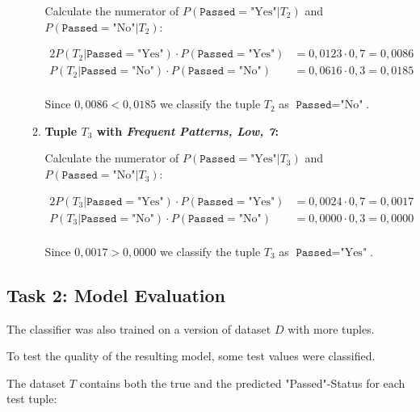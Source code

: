 \documentclass[
english,
smallborders
]{i6prcsht}
\newcommand{\BayesNumerator}[3]{P(#1 | \texttt{#2}=\text{"#3"}) \cdot P(\texttt{#2}=\text{"#3"})}
\newcommand{\PosterioriProbability}[3]{P(\texttt{#2}=\text{"#3"} | #1)}
\newcommand{\ResultClass}[2]{\texttt{#1}=\text{"#2"}}
\begin{document}
\begin{solution}
\begin{enumerate}
\begin{enumerate}
			            Calculate the numerator of $\PosterioriProbability{T_2}{Passed}{Yes}$ and $\PosterioriProbability{T_2}{Passed}{No}$:

			            \begin{alignat*}{2}
				            \BayesNumerator{T_2}{Passed}{Yes} & = 0,0123 \cdot 0,7 = 0,0086 \\
				            \BayesNumerator{T_2}{Passed}{No}  & = 0,0616 \cdot 0,3 = 0,0185 \\
			            \end{alignat*}

			            Since $0,0086 < 0,0185$ we classify the tuple $T_2$ as $\ResultClass{Passed}{No}$.

			      \item \textbf{Tuple $T_3$ with \textit{Frequent Patterns, Low, 7}:}

			            Calculate the numerator of $\PosterioriProbability{T_3}{Passed}{Yes}$ and $\PosterioriProbability{T_3}{Passed}{No}$:

			            \begin{alignat*}{2}
				            \BayesNumerator{T_3}{Passed}{Yes} & = 0,0024 \cdot 0,7 = 0,0017 \\
				            \BayesNumerator{T_3}{Passed}{No}  & = 0,0000 \cdot 0,3 = 0,0000 \\
			            \end{alignat*}

			            Since $0,0017 > 0,0000$ we classify the tuple $T_3$ as $\ResultClass{Passed}{Yes}$.
		      \end{enumerate}



	\end{enumerate}
\end{solution}

\newpage

\subsection*{Task 2: Model Evaluation}

The classifier was also trained on a version of dataset $D$ with more tuples.

To test the quality of the resulting model, some test values were classified.

The dataset $T$ contains both the true and the predicted "Passed"-Status for each test tuple:
\end{document}
